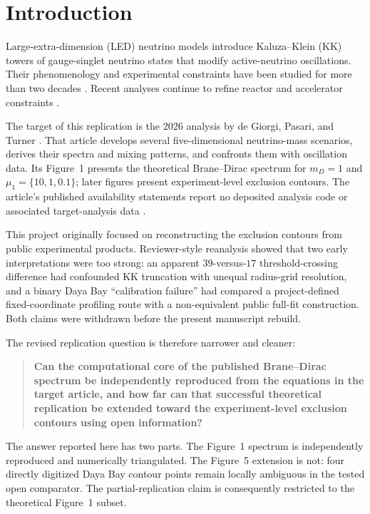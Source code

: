 \section{Introduction}\label{sec:introduction}

Large-extra-dimension (LED) neutrino models introduce Kaluza--Klein (KK) towers of gauge-singlet neutrino states that modify active-neutrino oscillations. Their phenomenology and experimental constraints have been studied for more than two decades \autocite{davoudiasl2002,machado2011,forero2022,eller2025}. Recent analyses continue to refine reactor and accelerator constraints \autocite{degiorgi2026,elacmaz2026}.

The target of this replication is the 2026 analysis by de Giorgi, Pasari, and Turner \autocite{degiorgi2026}. That article develops several five-dimensional neutrino-mass scenarios, derives their spectra and mixing patterns, and confronts them with oscillation data. Its Figure~1 presents the theoretical Brane--Dirac spectrum for $m_D=1$ and $\mu_1=\{10,1,0.1\}$; later figures present experiment-level exclusion contours. The article's published availability statements report no deposited analysis code or associated target-analysis data \autocite{degiorgi2026}.

This project originally focused on reconstructing the exclusion contours from public experimental products. Reviewer-style reanalysis showed that two early interpretations were too strong: an apparent $39$-versus-$17$ threshold-crossing difference had confounded KK truncation with unequal radius-grid resolution, and a binary Daya Bay ``calibration failure'' had compared a project-defined fixed-coordinate profiling route with a non-equivalent public full-fit construction. Both claims were withdrawn before the present manuscript rebuild.

The revised replication question is therefore narrower and cleaner:

\begin{quote}
\textbf{Can the computational core of the published Brane--Dirac spectrum be independently reproduced from the equations in the target article, and how far can that successful theoretical replication be extended toward the experiment-level exclusion contours using open information?}
\end{quote}

The answer reported here has two parts. The Figure~1 spectrum is independently reproduced and numerically triangulated. The Figure~5 extension is not: four directly digitized Daya Bay contour points remain locally ambiguous in the tested open comparator. The partial-replication claim is consequently restricted to the theoretical Figure~1 subset.

